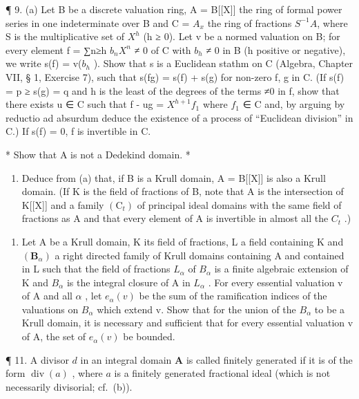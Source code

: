 ¶ 9. (a) Let B be a discrete valuation ring, A = B{[}{[}X{]}{]} the ring of formal power series in one indeterminate over B and C = \(A_{x}\) the ring of fractions \(S^{-1}A\), where S is the multiplicative set of \(X^{h}\) (h ≥ 0). Let v be a normed valuation on B; for every element f = ∑n≥h \(b_n X^{n}\) ≠ 0 of C with \(b_h\) ≠ 0 in B (h positive or negative), we write s(f) = v(\(b_h\) ). Show that s is a Euclidean stathm on C (Algebra, Chapter VII, § 1, Exercise 7), such that s(fg) = s(f) + s(g) for non-zero f, g in C. (If s(f) = p ≥ s(g) = q and h is the least of the degrees of the terms ≠0 in f, show that there exists u ∈ C such that f - ug = \(X^{h+1} f_1\) where \(f_1\) ∈ C and, by arguing by reductio ad absurdum deduce the existence of a process of ``Euclidean division'' in C.) If s(f) = 0, f is invertible in C.

* Show that A is not a Dedekind domain. *

\begin{enumerate}
\def\labelenumi{(\alph{enumi})}
\setcounter{enumi}{1}
\tightlist
\item
  Deduce from (a) that, if B is a Krull domain, A = B{[}{[}X{]}{]} is also a Krull domain. (If K is the field of fractions of B, note that A is the intersection of K{[}{[}X{]}{]} and a family \((\mathrm{C}_{t})\) of principal ideal domains with the same field of fractions as A and that every element of A is invertible in almost all the \(C_{t}\) .)
\end{enumerate}

\begin{enumerate}
\def\labelenumi{\arabic{enumi}.}
\setcounter{enumi}{9}
\tightlist
\item
  Let A be a Krull domain, K its field of fractions, L a field containing K and \((\mathbf{B}_{\alpha})\) a right directed family of Krull domains containing A and contained in L such that the field of fractions \(L_{\alpha}\) of \(B_{\alpha}\) is a finite algebraic extension of K and \(B_{\alpha}\) is the integral closure of A in \(L_{\alpha}\) . For every essential valuation v of A and all \(\alpha\) , let \(e_{\alpha}(v)\) be the sum of the ramification indices of the valuations on \(B_{\alpha}\) which extend v. Show that for the union of the \(B_{\alpha}\) to be a Krull domain, it is necessary and sufficient that for every essential valuation v of A, the set of \(e_{\alpha}(v)\) be bounded.
\end{enumerate}

¶ 11. A divisor \(d\) in an integral domain \(\mathbf{A}\) is called finitely generated if it is of the form \(\operatorname{div}(a)\) , where \(a\) is a finitely generated fractional ideal (which is not necessarily divisorial; cf.~(b)).

